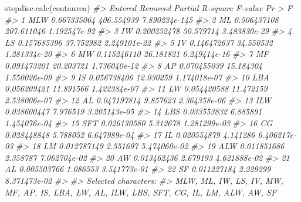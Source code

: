 \documentclass[
  11pt,
  a4paper]{article}
\newenvironment{Shaded}{\begin{snugshade}}{\end{snugshade}}
\newcommand{\CommentTok}[1]{\textcolor[rgb]{0.56,0.35,0.01}{\textit{#1}}}
\newcommand{\FunctionTok}[1]{\textcolor[rgb]{0.00,0.00,0.00}{#1}}
\newcommand{\NormalTok}[1]{#1}
\begin{document}
\begin{Shaded}
\begin{Highlighting}[]
\FunctionTok{stepdisc.calc}\NormalTok{(centaurea)}
\CommentTok{\#\textgreater{}    Entered Removed Partial R{-}square    F{-}value        Pr \textgreater{} F}
\CommentTok{\#\textgreater{} 1      MLW              0.667335064 406.554939 7.890234e{-}145}
\CommentTok{\#\textgreater{} 2       ML              0.506437108 207.611046  1.192547e{-}92}
\CommentTok{\#\textgreater{} 3       IW              0.200252478  50.579714  3.483830e{-}29}
\CommentTok{\#\textgreater{} 4       LS              0.157685396  37.752982  2.249101e{-}22}
\CommentTok{\#\textgreater{} 5       IV              0.146472637  34.550532  1.281334e{-}20}
\CommentTok{\#\textgreater{} 6       MW              0.115246110  26.181821  6.249414e{-}16}
\CommentTok{\#\textgreater{} 7       MF              0.091473201  20.203721  1.736040e{-}12}
\CommentTok{\#\textgreater{} 8       AP              0.070455039  15.184304  1.550026e{-}09}
\CommentTok{\#\textgreater{} 9       IS              0.056738406  12.030259  1.174018e{-}07}
\CommentTok{\#\textgreater{} 10     LBA              0.056209421  11.891566  1.422384e{-}07}
\CommentTok{\#\textgreater{} 11      LW              0.054420588  11.472159  2.538006e{-}07}
\CommentTok{\#\textgreater{} 12      AL              0.047197814   9.857623  2.364358e{-}06}
\CommentTok{\#\textgreater{} 13     ILW              0.038600447   7.976519  3.205143e{-}05}
\CommentTok{\#\textgreater{} 14     LBS              0.033553832   6.885891  1.454076e{-}04}
\CommentTok{\#\textgreater{} 15     SFT              0.026130580   5.312678  1.281299e{-}03}
\CommentTok{\#\textgreater{} 16      CG              0.028448848   5.788052  6.647989e{-}04}
\CommentTok{\#\textgreater{} 17      IL              0.020554879   4.141286  6.406217e{-}03}
\CommentTok{\#\textgreater{} 18      LM              0.012787149   2.551697  5.474060e{-}02}
\CommentTok{\#\textgreater{} 19     ALW              0.011851686   2.358787  7.062704e{-}02}
\CommentTok{\#\textgreater{} 20      AW              0.013462436   2.679193  4.621888e{-}02}
\CommentTok{\#\textgreater{} 21              AL      0.005503766   1.086553  3.541773e{-}01}
\CommentTok{\#\textgreater{} 22      SF              0.011227184   2.229299  8.371473e{-}02}
\CommentTok{\#\textgreater{} }
\CommentTok{\#\textgreater{} Selected characters:}
\CommentTok{\#\textgreater{} MLW, ML, IW, LS, IV, MW, MF, AP, IS, LBA, LW, AL, ILW, LBS, SFT, CG, IL, LM, ALW, AW, SF}
\end{Highlighting}
\end{Shaded}
\end{document}

